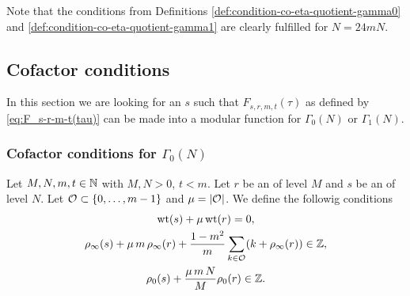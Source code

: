 \documentclass{article}
\begin{document}
Note that the conditions from Definitions
\ref{def:condition-co-eta-quotient-gamma0} and
\ref{def:condition-co-eta-quotient-gamma1} are clearly fulfilled for
$N=24mN$.




\subsection{Cofactor conditions}

In this section we are looking for an  $s$
such that $F_{s,r,m,t}(\tau)$ as defined by \eqref{eq:F_s-r-m-t(tau)} can be
made into a modular function for $\Gamma_0(N)$ or $\Gamma_1(N)$.


\subsubsection{Cofactor conditions for $\Gamma_0(N)$}


\begin{Definition}
  \label{def:cofactor-conditions}
  Let $M, N, m, t \in \mathbb{N}$ with $M,N>0$, $t<m$.
  Let $r$ be an  of level $M$ and $s$ be an
   of level $N$.
  Let $\mathcal{O}_{} \subset \left\{0,\ldots,m-1\right\}$ and
  $\mu=\lvert\mathcal{O}_{}\rvert$.
  We define the followig conditions
  \begin{gather}
    \operatorname{wt}(s) + \mu \operatorname{wt}(r)
    = 0,
    \label{eq:cofactor-weight}
    \\
    \rho_\infty(s) + \mu \, m \,\rho_\infty(r) +
     \frac{1-m^2}{m}\sum_{k \in \mathcal{O}_{}} (k + \rho_\infty(r))
    \in \mathbb{Z},
    \label{eq:cofactor-rho-infinity}
    \\
    \rho_0(s) + \frac{\mu \,m\, N}{M} \rho_0(r)
    \in \mathbb{Z}.
    \label{eq:cofactor-rho-zero}
  \end{gather}
\end{Definition}
\end{document}
